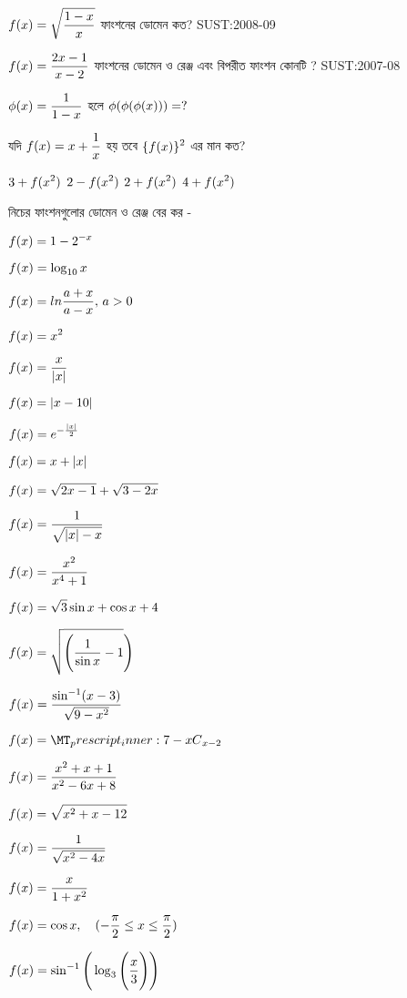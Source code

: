 \documentclass[addpoints]{exam}
\newcommand\Mycomb[2][^n]{\prescript{#1\mkern-0.5mu}{}C_{#2}}
\begin{document}
\begin{questions}
\question $\mathlarger{f(x)=\sqrt{\frac{1-x}{x}}}$ ফাংশনের ডোমেন কত?    \hfill \textsc{SUST:2008-09}

\question $\mathlarger{f(x)=\frac{2x-1}{x-2}}$ ফাংশনের ডোমেন ও রেঞ্জ এবং বিপরীত ফাংশন কোনটি ? \hfill \textsc{SUST:2007-08}

\question $\mathlarger{\phi(x)=\frac{1}{1-x}}$ হলে $\mathlarger{\phi(\phi(\phi(x)))=?}$

\question যদি $\mathlarger{f(x)=x+\frac{1}{x}}$ হয় তবে $\mathlarger{\{f(x) \}^2}$ এর মান কত?

				\begin{oneparchoices}
 \choice $\mathlarger{3+f(x^2)}$
 \choice $\mathlarger{2-f(x^2)}$
 \choice $\mathlarger{2+f(x^2)}$
\choice $\mathlarger{4+f(x^2)}$
\end{oneparchoices}
\begin{center}
\begin{LARGE}
নিচের ফাংশনগুলোর ডোমেন ও রেঞ্জ বের কর -
\end{LARGE}
\end{center}

                                   \question $\mathlarger{f(x)=1-2^{-x}}$

\question $\mathlarger{f(x)=\log_{10} x}$

\question $\mathlarger{f(x)=ln \frac{a+x}{a-x}},\, a>0$

\question $\mathlarger{f(x)= x^2}$

\question $\mathlarger{f(x)= \frac{x}{|x|}}\,$

\question $\mathlarger{f(x)= |x-10|}$

\question $\mathlarger{f(x)= e^{-\frac{|x|}{2}}}\,$

\question $\mathlarger{f(x)= x+|x|}$

\question $\mathlarger{f(x)= \sqrt{2x-1}+\sqrt{3-2x}}$

\question $\mathlarger{f(x)= \frac{1}{\sqrt{|x|-x}}}$

\question $\mathlarger{f(x)= \frac{x^2}{x^4 + 1}}$

\question $\mathlarger{f(x)= \sqrt{3}\sin x + \cos x +4}$

\question $\mathlarger{f(x)= \sqrt{\Bigg( \frac{1}{\sin x} - 1} \Bigg)}$

\question $\mathlarger{f(x)= \frac{\sin ^{-1}(x-3)}{\sqrt{9-x^2}}}$

\question $\mathlarger{f(x)= \Mycomb[7-x]{x-2}}$

\question $\mathlarger{f(x)= \frac{x^2+x+1}{x^2-6x+8}}$

\question $\mathlarger{f(x)= \sqrt{x^2+x-12}}$

\question $\mathlarger{f(x)= \frac{1}{\sqrt{x^2-4x}}}$

\question $\mathlarger{f(x)= \frac{x}{1+x^2}}$

\question $\mathlarger{f(x)= \cos x, \quad (-\frac{\pi}{2} \le x\le \frac{\pi}{2})}$

\question $\mathlarger{f(x)= \sin^{-1}\Bigg( \log_3 \Bigg( \dfrac{x}{3} \Bigg)\Bigg)}$

\end{questions}
\end{document}
